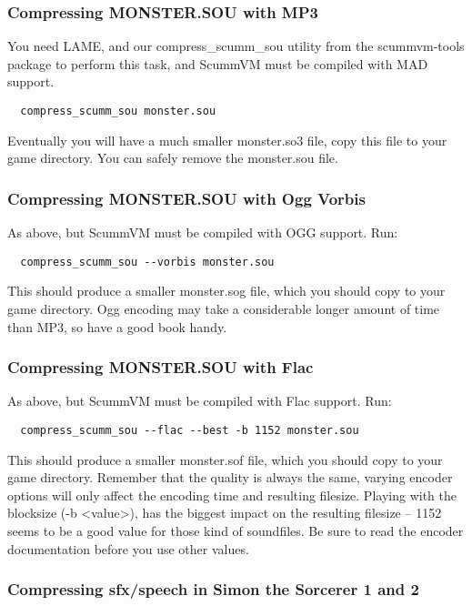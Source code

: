 \subsubsection{Compressing MONSTER.SOU with MP3}

You need LAME, and our compress\_scumm\_sou utility from the scummvm-tools
package to perform this task, and ScummVM must be compiled with MAD support.
\begin{verbatim}
  compress_scumm_sou monster.sou
\end{verbatim}
%
Eventually you will have a much smaller monster.so3 file, copy this file
to your game directory. You can safely remove the monster.sou file.


\subsubsection{Compressing MONSTER.SOU with Ogg Vorbis}

As above, but ScummVM must be compiled with OGG support. Run:
\begin{verbatim}
  compress_scumm_sou --vorbis monster.sou
\end{verbatim}
%
This should produce a smaller monster.sog file, which you should copy to your
game directory. Ogg encoding may take a considerable longer amount of time
than MP3, so have a good book handy.


\subsubsection{Compressing MONSTER.SOU with Flac}

As above, but ScummVM must be compiled with Flac support. Run:
\begin{verbatim}
  compress_scumm_sou --flac --best -b 1152 monster.sou
\end{verbatim}
%
This should produce a smaller monster.sof file, which you should copy to your
game directory. Remember that the quality is always the same, varying encoder
options will only affect the encoding time and resulting  filesize. Playing
with the blocksize (-b <value>), has the biggest impact on the resulting
filesize -- 1152 seems to be a good value for those kind of soundfiles. Be sure
to read the encoder documentation before you use other values.


\subsubsection{Compressing sfx/speech in Simon the Sorcerer 1 and 2}


